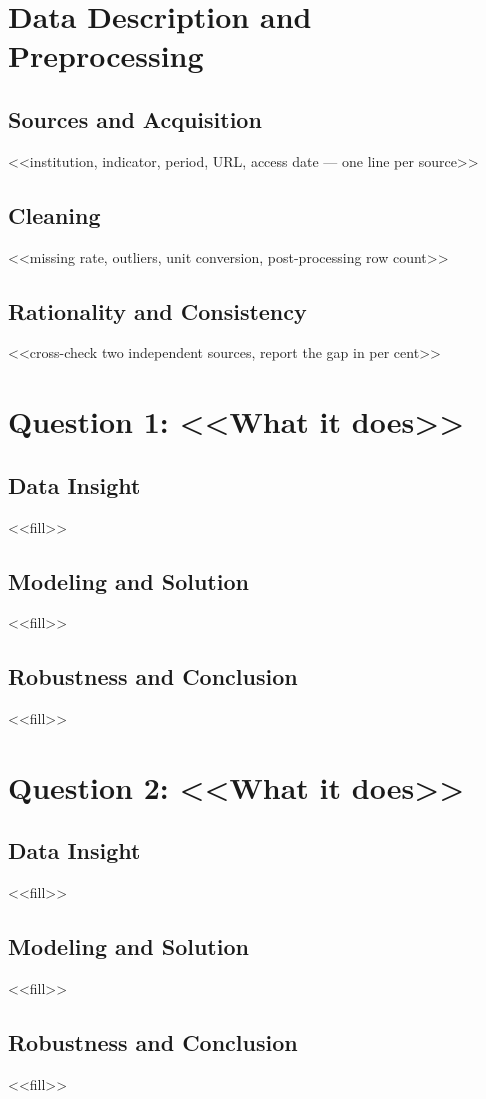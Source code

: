 \documentclass{swmcmthesis}
\begin{document}
\section{Data Description and Preprocessing}
\subsection{Sources and Acquisition}
<<institution, indicator, period, URL, access date --- one line per source>>
\subsection{Cleaning}
<<missing rate, outliers, unit conversion, post-processing row count>>
\subsection{Rationality and Consistency}
<<cross-check two independent sources, report the gap in per cent>>
\section{Question 1: <<What it does>>}
\subsection{Data Insight}
<<fill>>
\subsection{Modeling and Solution}
<<fill>>
\subsection{Robustness and Conclusion}
<<fill>>
\section{Question 2: <<What it does>>}
\subsection{Data Insight}
<<fill>>
\subsection{Modeling and Solution}
<<fill>>
\subsection{Robustness and Conclusion}
<<fill>>
\end{document}
